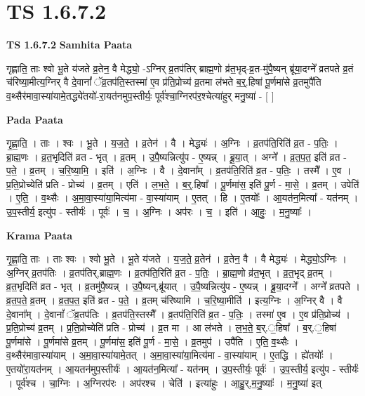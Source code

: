\documentclass[17pt]{extarticle}
\begin{document}
\section*{ TS 1.6.7.2 }

\textbf{TS 1.6.7.2 } \newline
\textbf{Samhita Paata} \newline

गृह्णाति॒ ताः श्वो भू॒ते य॑जते व्र॒तेन॒ वै मेद्ध्यो॒ -ऽग्निर् व्र॒तप॑तिर् ब्राह्म॒णो व्र॑त॒भृद्-व्र॒त-मु॑पै॒ष्यन् ब्रू॑या॒दग्ने᳚ व्रतपते व्र॒तं च॑रिष्या॒मीत्य॒ग्निर् वै दे॒वानां᳚ ॅव्र॒तप॑ति॒स्तस्मा॑ ए॒व प्र॑ति॒प्रोच्य॑ व्र॒तमा ल॑भते ब॒र्॒.हिषा॑ पू॒र्णमा॑से व्र॒तमुपै॑ति व॒थ्सैर॑मावा॒स्या॑यामे॒तद्ध्ये॑तयो॑-रा॒यत॑नमुप॒स्तीर्यः॒ पूर्व॑श्चा॒ग्निरप॑र॒श्चेत्या॑हुर् मनु॒ष्या॑ - [ ] \newline

\textbf{Pada Paata} \newline

गृ॒ह्णा॒ति॒ । ताः । श्वः । भू॒ते । य॒ज॒ते॒ । व्र॒तेन॑ । वै । मेद्ध्यः॑ । अ॒ग्निः । व्र॒तप॑ति॒रिति॑ व्र॒त - प॒तिः॒ । ब्रा॒ह्म॒णः । व्र॒त॒भृदिति॑ व्रत - भृत् । व्र॒तम् । उ॒पै॒ष्यन्नित्यु॑प - ए॒ष्यन्न् । ब्रू॒या॒त् । अग्ने᳚ । व्र॒त॒प॒त॒ इति॑ व्रत - प॒ते॒ । व्र॒तम् । च॒रि॒ष्या॒मि॒ । इति॑ । अ॒ग्निः । वै । दे॒वाना᳚म् । व्र॒तप॑ति॒रिति॑ व्र॒त - प॒तिः॒ । तस्मै᳚ । ए॒व । प्र॒ति॒प्रोच्येति॑ प्रति - प्रोच्य॑ । व्र॒तम् । एति॑ । ल॒भ॒ते॒ । ब॒र्॒.हिषा᳚ । पू॒र्णमा॑स॒ इति॑ पू॒र्ण - मा॒से॒ । व्र॒तम् । उपेति॑ । ए॒ति॒ । व॒थ्सैः । अ॒मा॒वा॒स्या॑या॒मित्य॑मा - वा॒स्या॑याम् । ए॒तत् । हि । ए॒तयोः᳚ । आ॒यत॑न॒मित्या᳚ - यत॑नम् । उ॒प॒स्तीर्य॒ इत्यु॑प - स्तीर्यः॑ । पूर्वः॑ । च॒ । अ॒ग्निः । अप॑रः । च॒ । इति॑ । आ॒हुः॒ । म॒नु॒ष्याः᳚ ।  \newline


\textbf{Krama Paata} \newline

गृ॒ह्णा॒ति॒ ताः । ताः श्वः । श्वो भू॒ते । भू॒ते य॑जते । य॒ज॒ते॒ व्र॒तेन॑ । व्र॒तेन॒ वै । वै मेद्ध्यः॑ । मेद्ध्यो॒ऽग्निः । अ॒ग्निर् व्र॒तप॑तिः । व्र॒तप॑तिर्,ब्राह्म॒णः । व्र॒तप॑ति॒रिति॑ व्र॒त - प॒तिः॒ । ब्रा॒ह्म॒णो व्र॑त॒भृत् । व्र॒त॒भृद् व्र॒तम् । व्र॒त॒भृदिति॑ व्रत - भृत् । व्र॒तमु॑पै॒ष्यन्न् । उ॒पै॒ष्यन्,ब्रू॑यात् । उ॒पै॒ष्यन्नित्यु॑प - ए॒ष्यन्न् । ब्रू॒या॒दग्ने᳚ । अग्ने᳚ व्रतपते । व्र॒त॒प॒ते॒ व्र॒तम् । व्र॒त॒प॒त॒ इति॑ व्रत - प॒ते॒ । व्र॒तम् च॑रिष्यामि । च॒रि॒ष्या॒मीति॑ । इत्य॒ग्निः । अ॒ग्निर् वै । वै दे॒वाना᳚म् । दे॒वानां᳚ ॅव्र॒तप॑तिः । व्र॒तप॑ति॒स्तस्मै᳚ । व्र॒तप॑ति॒रिति॑ व्र॒त - प॒तिः॒ । तस्मा॑ ए॒व । ए॒व प्र॑ति॒प्रोच्य॑ । प्र॒ति॒प्रोच्य॑ व्र॒तम् । प्र॒ति॒प्रोच्येति॑ प्रति - प्रोच्य॑ । व्र॒त मा । आ ल॑भते । ल॒भ॒ते॒ ब॒र्.॒हिषा᳚ । ब॒र्.॒हिषा॑ पू॒र्णमा॑से । पू॒र्णमा॑से व्र॒तम् । पू॒र्णमा॑स॒ इति॑ पू॒र्ण - मा॒से॒ । व्र॒तमुप॑ । उपै॑ति । ए॒ति॒ व॒थ्सैः । व॒थ्सैर॑मावा॒स्या॑याम् । अ॒मा॒वा॒स्या॑यामे॒तत् । अ॒मा॒वा॒स्या॑या॒मित्य॑मा - वा॒स्या॑याम् । ए॒तद्धि । ह्ये॑तयोः᳚ । ए॒तयो॑रा॒यत॑नम् । आ॒यतन॑मुप॒स्तीर्यः॑ । आ॒यत॑न॒मित्या᳚ - यत॑नम् । उ॒प॒स्तीर्यः॒ पूर्वः॑ । उ॒प॒स्तीर्य॒ इत्यु॑प - स्तीर्यः॑ । पूर्व॑श्च । चा॒ग्निः । अ॒ग्निरप॑रः । अप॑रश्च । चेति॑ । इत्या॑हुः । आ॒हु॒र्,म॒नु॒ष्याः᳚ । म॒नु॒ष्या॑ इत् \newline
\end{document}
